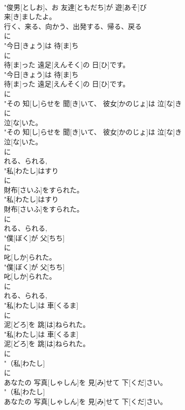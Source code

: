 \documentclass[8pt]{extreport}
\begin{document}
\begin{CJK}{UTF8}{min}
\\	"俊男[としお]、お 友達[ともだち]が 遊[あそ]び
\\	来[き]ましたよ。
\\	行く、来る、向かう、出発する、帰る、戻る	
\\	に
\\	"今日[きょう]は 待[ま]ち
\\	に
\\	待[ま]った 遠足[えんそく]の 日[ひ]です。
\\	"今日[きょう]は 待[ま]ち
\\	待[ま]った 遠足[えんそく]の 日[ひ]です。
\\	に
\\	"その 知[し]らせを 聞[き]いて、 彼女[かのじょ]は 泣[な]き
\\	に
\\	泣[な]いた。
\\	"その 知[し]らせを 聞[き]いて、 彼女[かのじょ]は 泣[な]き
\\	泣[な]いた。
\\	に
\\	れる、られる, 
\\	"私[わたし]はすり
\\	に
\\	財布[さいふ]をすられた。
\\	"私[わたし]はすり
\\	財布[さいふ]をすられた。
\\	に
\\	れる、られる, 
\\	"僕[ぼく]が 父[ちち]
\\	に
\\	叱[しか]られた。
\\	"僕[ぼく]が 父[ちち]
\\	叱[しか]られた。
\\	に
\\	れる、られる, 
\\	"私[わたし]は 車[くるま]
\\	に
\\	泥[どろ]を 跳[は]ねられた。
\\	"私[わたし]は 車[くるま]
\\	泥[どろ]を 跳[は]ねられた。
\\	に
\\	"（私[わたし]
\\	に
\\	あなたの 写真[しゃしん]を 見[み]せて 下[くだ]さい。
\\	"（私[わたし]
\\	あなたの 写真[しゃしん]を 見[み]せて 下[くだ]さい。

\end{CJK}
\end{document}
